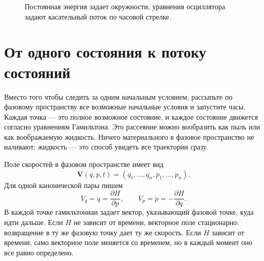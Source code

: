 \begin{figure}[htbp]
  \centering
  \caption{Постоянная энергия задает окружности; уравнения осциллятора задают касательный поток по часовой стрелке.}
\end{figure}

\begin{classroomqa}
\end{classroomqa}

\section{От одного состояния к потоку состояний}

Вместо того чтобы следить за одним начальным условием, рассыпьте по фазовому пространству все возможные начальные условия и запустите часы. Каждая точка — это полное возможное состояние, и каждое состояние движется согласно уравнениям Гамильтона. Это рассеяние можно вообразить как пыль или как воображаемую жидкость. Ничего материального в фазовое пространство не наливают; жидкость — это способ увидеть все траектории сразу.

Поле скоростей в фазовом пространстве имеет вид
\begin{equation}
  \mathbf V(q,p,t)
  =
  (\dot q_1,\ldots,\dot q_n,\dot p_1,\ldots,\dot p_n).
  \label{eq:l7-phase-velocity}
\end{equation}
Для одной канонической пары пишем
\begin{equation}
  V_q=\dot q=\frac{\partial H}{\partial p},
  \qquad
  V_p=\dot p=-\frac{\partial H}{\partial q}.
  \label{eq:l7-phase-components}
\end{equation}
В каждой точке гамильтониан задает вектор, указывающий фазовой точке, куда идти дальше. Если \(H\) не зависит от времени, векторное поле стационарно: возвращение в ту же фазовую точку дает ту же скорость. Если \(H\) зависит от времени, само векторное поле меняется со временем, но в каждый момент оно все равно определено.

